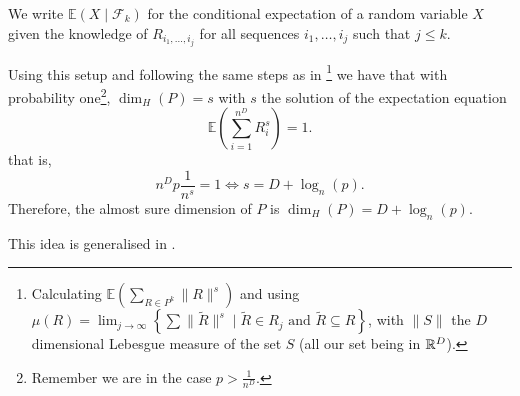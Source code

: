 We write $\mathbb{E}\left( X \mid \mathcal{F}_k \right)$ for the conditional expectation of a random variable $X$ given the knowledge of $R_{i_1,\dots,i_j}$ for all sequences $i_1,\dots,i_j$ such that $j \leq k$.

Using this setup and following the same steps as in \cite[p268-271, proof of Th. 15.1]{Falconer_1990}\footnote{Calculating $\mathbb{E}\left( \sum_{R \in P^k} \| R \|^s \right)$ and using $\mu(R) = \lim_{j \to \infty} \left\{ \sum \|\tilde{R}\|^s \mid \tilde{R} \in R_j \text{ and } \tilde{R} \subseteq R \right\}$, with $\| S \|$ the $D$ dimensional Lebesgue measure of the set $S$ (all our set being in $\mathbb{R}^D$).} we have that with probability one\footnote{Remember we are in the case $p>\frac{1}{n^D}$.}, $\dim_H(P) = s$ with $s$ the solution of the expectation equation
$$\mathbb{E}\left( \sum_{i=1}^{n^D} R_i^s \right) = 1.$$
that is, 
$$n^Dp\frac{1}{n^s} = 1 \iff s = D + \log_n(p).$$
Therefore, the almost sure dimension of $P$ is $\dim_H(P) = D + \log_n(p)$.

This idea is generalised in \cite[p.271, Th. 15.2]{Falconer_1990}.

%
%

